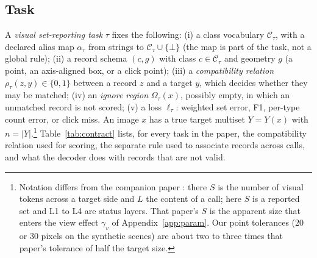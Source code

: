 \subsection{Task}
A \emph{visual set-reporting task} $\tau$ fixes the following:
(i) a class vocabulary $\mathcal{C}_\tau$, with a declared alias map $\alpha_\tau$ from strings to $\mathcal{C}_\tau\cup\{\bot\}$ (the map is part of the task, not a global rule);
(ii) a record schema $(c,g)$ with class $c\in\mathcal{C}_\tau$ and geometry $g$ (a point, an axis-aligned box, or a click point);
(iii) a \emph{compatibility relation} $\rho_\tau(z,y)\in\{0,1\}$ between a record $z$ and a target $y$, which decides whether they may be matched;
(iv) an \emph{ignore region} $\Omega_\tau(x)$, possibly empty, in which an unmatched record is not scored;
(v) a loss $\ell_\tau$: weighted set error, F1, per-type count error, or click miss.
An image $x$ has a true target multiset $Y=Y(x)$ with $n=|Y|$.\footnote{Notation differs from the companion paper \citep{shi2026zoomin}: there $S$ is the number of visual tokens across a target side and $L$ the content of a call; here $S$ is a reported set and L1 to L4 are status layers. That paper's $S$ is the apparent size that enters the view effect $\gamma_v$ of Appendix~\ref{app:param}. Our point tolerances (20 or 30 pixels on the synthetic scenes) are about two to three times that paper's tolerance of half the target size.}
Table~\ref{tab:contract} lists, for every task in the paper, the compatibility relation used for scoring, the separate rule used to associate records across calls, and what the decoder does with records that are not valid.


